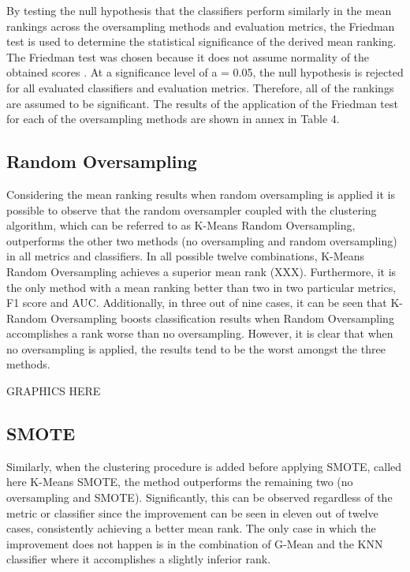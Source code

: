 \documentclass[parskip=full]{scrartcl}
\begin{document}
By testing the null hypothesis that the classifiers perform similarly in the 
mean rankings across the oversampling methods and evaluation metrics, the 
Friedman test \cite{Friedman1937} is used to determine the statistical 
significance of the derived mean ranking. The Friedman test was chosen because 
it does not assume normality of the obtained scores \cite{Demsar2006}. At a 
significance level of a = 0.05, the null hypothesis is rejected for all 
evaluated classifiers and evaluation metrics. Therefore, all of the rankings 
are assumed to be significant. The results of the application of the Friedman 
test for each of the oversampling methods are shown in annex in Table 4.

\subsection{Random Oversampling}

Considering the mean ranking results when random oversampling is applied it is 
possible to observe that the random oversampler coupled with the clustering 
algorithm, which can be referred to as K-Means Random Oversampling, outperforms 
the other two methods (no oversampling and random oversampling) in all metrics 
and classifiers. In all possible twelve combinations, K-Means Random 
Oversampling achieves a superior mean rank (XXX). Furthermore, it is the only 
method with a mean ranking better than two in two particular metrics, F1 score 
and AUC. Additionally, in three out of nine cases, it can be seen that K-Random 
Oversampling boosts classification results when Random Oversampling 
accomplishes a rank worse than no oversampling. However, it is clear that when 
no oversampling is applied, the results tend to be the worst amongst the three 
methods.

GRAPHICS HERE

\subsection{SMOTE}

Similarly, when the clustering procedure is added before applying SMOTE, called 
here K-Means SMOTE, the method outperforms the remaining two (no oversampling 
and SMOTE). Significantly, this can be observed regardless of the metric or 
classifier since the improvement can be seen in eleven out of twelve cases, 
consistently achieving a better mean rank. The only case in which the 
improvement does not happen is in the combination of G-Mean and the KNN 
classifier where it accomplishes a slightly inferior rank. 
\end{document}
